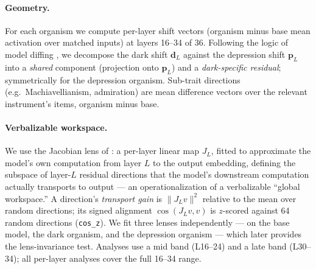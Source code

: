 \documentclass[11pt]{article}
\begin{document}
\paragraph{Geometry.}
For each organism we compute per-layer shift vectors (organism minus base mean activation over
matched inputs) at layers 16--34 of 36. Following the logic of model diffing
\citep{lindsey2024crosscoders}, we decompose the dark shift $\mathbf{d}_L$ against the depression
shift $\mathbf{p}_L$ into a \emph{shared} component (projection onto $\mathbf{p}_L$) and a
\emph{dark-specific residual}; symmetrically for the depression organism. Sub-trait directions
(e.g.\ Machiavellianism, admiration) are mean difference vectors over the relevant instrument's
items, organism minus base.

\paragraph{Verbalizable workspace.}
We use the Jacobian lens of \citet{gurnee2026workspace}: a per-layer linear map $J_L$, fitted to
approximate the model's own computation from layer $L$ to the output embedding, defining the
subspace of layer-$L$ residual directions that the model's downstream computation actually
transports to output --- an operationalization of a verbalizable ``global workspace.'' A
direction's \emph{transport gain} is $\|J_L v\|^2$ relative to the mean over random directions;
its signed alignment $\cos(J_L v, v)$ is $z$-scored against 64 random directions
(\texttt{cos\_z}). We fit three lenses independently --- on the base model, the dark organism,
and the depression organism --- which later provides the lens-invariance test. Analyses use a
mid band (L16--24) and a late band (L30--34); all per-layer analyses cover the full 16--34 range.
\end{document}
